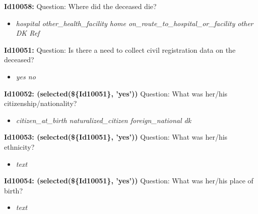 \documentclass{article}%
\begin{document}
\textbf{Id10058: \newline%
}%
Question: Where did the deceased die?\newline%
%
\begin{itemize}%
\item%
\textit{hospital\newline%
 other\_health\_facility\newline%
 home\newline%
 on\_route\_to\_hospital\_or\_facility\newline%
 other\newline%
 DK\newline%
 Ref\newline%
}%
\end{itemize}%
\textbf{Id10051: \newline%
}%
Question: Is there a need to collect civil registration data on the deceased?\newline%
%
\begin{itemize}%
\item%
\textit{yes\newline%
 no\newline%
}%
\end{itemize}%
\textbf{Id10052: (selected(\$\{Id10051\}, 'yes'))\newline%
}%
Question: What was her/his citizenship/nationality?\newline%
%
\begin{itemize}%
\item%
\textit{citizen\_at\_birth\newline%
 naturalized\_citizen\newline%
 foreign\_national\newline%
 dk\newline%
}%
\end{itemize}%
\textbf{Id10053: (selected(\$\{Id10051\}, 'yes'))\newline%
}%
Question: What was her/his ethnicity?\newline%
%
\begin{itemize}%
\item%
\textit{text\newline%
}%
\end{itemize}%
\textbf{Id10054: (selected(\$\{Id10051\}, 'yes'))\newline%
}%
Question: What was her/his place of birth?\newline%
%
\begin{itemize}%
\item%
\textit{text\newline%
}%
\end{itemize}%
\end{document}
